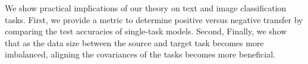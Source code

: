 
We show practical implications of our theory on text and image classification tasks.
	First, we provide a metric to determine positive versus negative transfer by comparing the test accuracies of single-task models.
	Second, \todo{}
	Finally, we show that as the data size between the source and target task becomes more imbalanced, aligning the covariances of the tasks becomes more beneficial.




